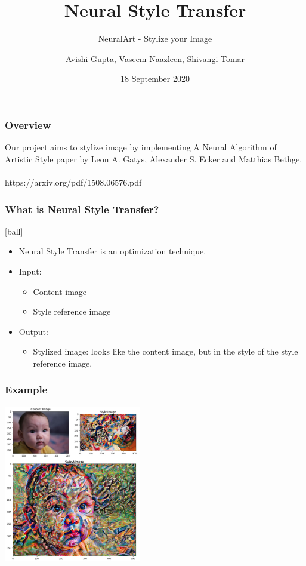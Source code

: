 \documentclass[14pt]{beamer}
\title[NST]{Neural Style Transfer}
\subtitle{NeuralArt - Stylize your Image}
\author[Team - 38]{Avishi Gupta, Vaseem Naazleen, Shivangi Tomar}
\date{18 September 2020}
\begin{document}
\begin{frame}
   \titlepage
\end{frame}

\begin{frame}
		\frametitle{Overview}
		Our project aims to stylize image by implementing A Neural Algorithm of Artistic Style paper by Leon A. Gatys, Alexander S. Ecker and Matthias Bethge. \\~\\

		https://arxiv.org/pdf/1508.06576.pdf
\end{frame}

\begin{frame}
		\frametitle{What is Neural Style Transfer?}
		\begin{itemize}
            \item Neural Style Transfer is an optimization technique.
           \item Input:
		\begin{itemize}
		     \item Content image
		     \item Style reference image
		\end{itemize}
             \item Output:
		\begin{itemize}
             \item Stylized image: looks like the content image, but  in the style of the style
        reference image.
        \end{itemize}
        \end{itemize}
\end{frame}

\begin{frame}
    \frametitle{Example}
    \begin{center}
        \includegraphics[width=60mm]{baby.jpeg}
    \end{center}
\end{frame}
\end{document}
